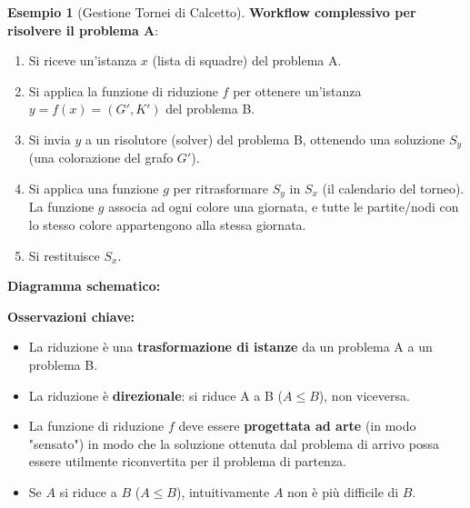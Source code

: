 \documentclass[a4paper]{article}
\theoremstyle{definition} %
\newtheorem{example}[theorem]{Esempio}
\begin{document}
\begin{example}[Gestione Tornei di Calcetto]
\textbf{Workflow complessivo per risolvere il problema A}:
\begin{enumerate}
    \item Si riceve un'istanza $x$ (lista di squadre) del problema A.
    \item Si applica la funzione di riduzione $f$ per ottenere un'istanza $y = f(x) = (G', K')$ del problema B.
    \item Si invia $y$ a un risolutore (solver) del problema B, ottenendo una soluzione $S_y$ (una colorazione del grafo $G'$).
    \item Si applica una funzione $g$ per ritrasformare $S_y$ in $S_x$ (il calendario del torneo). La funzione $g$ associa ad ogni colore una giornata, e tutte le partite/nodi con lo stesso colore appartengono alla stessa giornata.
    \item Si restituisce $S_x$.
\end{enumerate}

\textbf{Diagramma schematico:}
\begin{center}
\end{center}

\textbf{Osservazioni chiave:}
\begin{itemize}
    \item La riduzione è una \textbf{trasformazione di istanze} da un problema A a un problema B.
    \item La riduzione è \textbf{direzionale}: si riduce A a B ($A \le B$), non viceversa.
    \item La funzione di riduzione $f$ deve essere \textbf{progettata ad arte} (in modo "sensato") in modo che la soluzione ottenuta dal problema di arrivo possa essere utilmente riconvertita per il problema di partenza.
    \item Se $A$ si riduce a $B$ ($A \le B$), intuitivamente $A$ non è più difficile di $B$.
\end{itemize}
\end{example}
\end{document}
